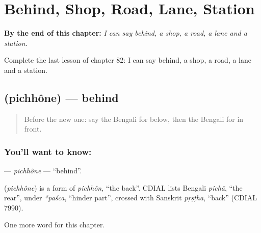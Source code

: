 
\chapter{Behind, Shop, Road, Lane, Station}
\label{ch:bn-behind-shop-road-lane-station}

\begin{chapteropening}
\textbf{By the end of this chapter:} \emph{I can say behind, a shop, a road, a lane and a station.}

Complete the last lesson of chapter 82: I can say behind, a shop, a road, a lane and a station.
\end{chapteropening}

\section[\texorpdfstring{\bn{পিছনে} (pichhône)}{পিছনে (pichhône)}]{ (pichhône) — behind}

\label{lesson:BN-C82-pichhone}



\begin{quote}
Before the new one: say the Bengali for below, then the Bengali for in front.
\end{quote}

\subsection*{You'll want to know: }
\textbf{} — \emph{pichhône} — \textquotedblleft{}behind\textquotedblright{}.

\begin{cousinweb}
\textbf{} (\emph{pichhône}) is a form of \emph{pichhôn}, \textquotedblleft{}the back\textquotedblright{}. CDIAL lists Bengali \emph{pichā}, \textquotedblleft{}the rear\textquotedblright{}, under \emph{*paśca}, \textquotedblleft{}hinder part\textquotedblright{}, crossed with Sanskrit \emph{pṛṣṭha}, \textquotedblleft{}back\textquotedblright{} (CDIAL 7990).
\end{cousinweb}

\begin{grammarlens}[title={What you've built}]
One more word for this chapter.
\end{grammarlens}

